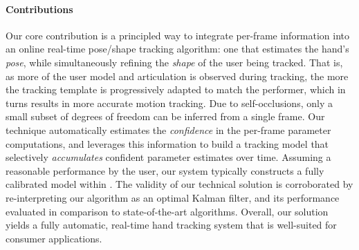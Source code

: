 \paragraph{Contributions}
Our core contribution is a principled way to integrate per-frame information into an online real-time pose/shape tracking algorithm: one that estimates the hand's \emph{pose}, while simultaneously refining the \emph{shape} of the user being tracked. That is, as more of the user model and articulation is observed during tracking, the more the tracking template is progressively adapted to match the performer, which in turns results in more accurate motion tracking. Due to self-occlusions, only a small subset of degrees of freedom can be inferred from a single frame. Our technique automatically estimates the \emph{confidence} in the per-frame parameter computations, and leverages this information to build a tracking model that selectively \emph{accumulates} confident parameter estimates over time. Assuming a reasonable performance by the user, our system typically constructs a fully calibrated model within . The validity of our technical solution is corroborated by re-interpreting our algorithm as an optimal Kalman filter, and its performance evaluated in comparison to state-of-the-art algorithms. Overall, our solution yields a fully automatic, real-time hand tracking system that is well-suited for consumer applications.
